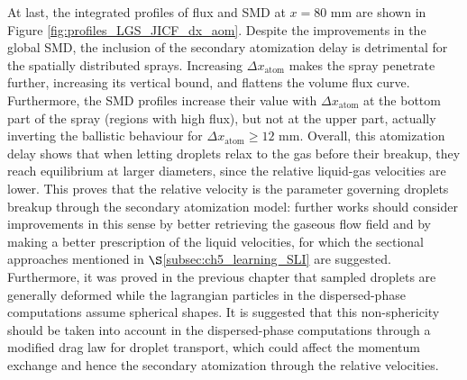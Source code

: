 At last, the integrated profiles of flux and SMD at $x = 80$ mm are shown in Figure \ref{fig:profiles_LGS_JICF_dx_aom}. Despite the improvements in the global SMD, the inclusion of the secondary atomization delay is detrimental for the spatially distributed sprays. Increasing $\Delta x_\mathrm{atom}$ makes the spray penetrate further, increasing its vertical bound, and flattens the volume flux curve. Furthermore, the SMD profiles increase their value with $\Delta x_\mathrm{atom}$ at the bottom part of the spray (regions with high flux), but not at the upper part, actually inverting the ballistic behaviour for $\Delta x_\mathrm{atom} \geq 12$ mm. Overall, this atomization delay shows that when letting droplets relax to the gas before their breakup, they reach equilibrium at larger diameters, since the relative liquid-gas velocities are lower.  This proves that the relative velocity is the parameter governing droplets breakup through the secondary atomization model: further works should consider improvements in this sense by better retrieving the gaseous flow field and by making a better prescription of the liquid velocities, for which the sectional approaches mentioned in $\S$\ref{subsec:ch5_learning_SLI} are suggested. Furthermore, it was proved in the previous chapter that sampled droplets are generally deformed while the lagrangian particles in the dispersed-phase computations assume spherical shapes. It is suggested that this non-sphericity should be taken into account in the dispersed-phase computations through a modified drag law for droplet transport, which could affect the momentum exchange and hence the secondary atomization through the relative velocities. 


